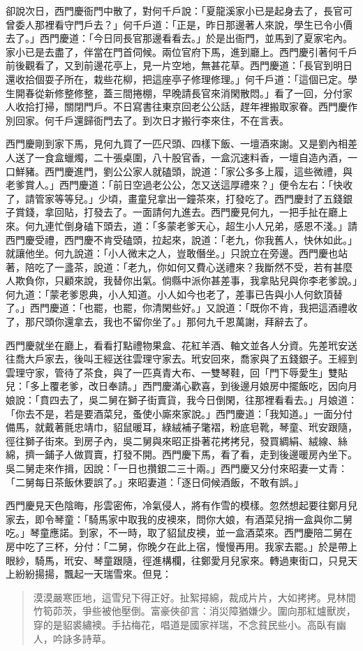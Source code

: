 卻說次日，西門慶衙門中散了，對何千戶說：「夏龍溪家小已是起身去了，長官可曾委人那裡看守門戶去？」何千戶道：「正是，昨日那邊著人來說，學生已令小價去了。」西門慶道：「今日同長官那邊看看去。」於是出衙門，並馬到了夏家宅內。家小已是去盡了，伴當在門首伺候。兩位官府下馬，進到廳上。西門慶引著何千戶前後觀看了，又到前邊花亭上，見一片空地，無甚花草。西門慶道：「長官到明日還收拾個耍子所在，栽些花柳，把這座亭子修理修理。」何千戶道：「這個已定。學生開春從新修整修整，蓋三間捲棚，早晚請長官來消閑散悶。」看了一回，分付家人收拾打掃，關閉門戶。不日寫書往東京回老公公話，趕年裡搬取家眷。西門慶作別回家。何千戶還歸衙門去了。到次日才搬行李來住，不在言表。

西門慶剛到家下馬，見何九買了一匹尺頭、四樣下飯、一壇酒來謝。又是劉內相差人送了一食盒蠟燭，二十張桌圍，八十股官香，一盒沉速料香，一壇自造內酒，一口鮮豬。西門慶進門，劉公公家人就磕頭，說道：「家公多多上履，這些微禮，與老爹賞人。」西門慶道：「前日空過老公公，怎又送這厚禮來？」便令左右：「快收了，請管家等等兒。」少頃，畫童兒拿出一鐘茶來，打發吃了。西門慶封了五錢銀子賞錢，拿回貼，打發去了。一面請何九進去。西門慶見何九，一把手扯在廳上來。何九連忙倒身磕下頭去，道：「多蒙老爹天心，超生小人兄弟，感恩不淺。」請西門慶受禮，西門慶不肯受磕頭，拉起來，說道：「老九，你我舊人，快休如此。」就讓他坐。何九說道：「小人微末之人，豈敢僭坐。」只說立在旁邊。西門慶也站著，陪吃了一盞茶，說道：「老九，你如何又費心送禮來？我斷然不受，若有甚麼人欺負你，只顧來說，我替你出氣。倘縣中派你甚差事，我拿貼兒與你李老爹說。」何九道：「蒙老爹恩典，小人知道。小人如今也老了，差事已告與小人何欽頂替了。」西門慶道：「也罷，也罷，你清閑些好。」又說道：「既你不肯，我把這酒禮收了，那尺頭你還拿去，我也不留你坐了。」那何九千恩萬謝，拜辭去了。

西門慶就坐在廳上，看看打點禮物果盒、花紅羊酒、軸文並各人分資。先差玳安送往喬大戶家去，後叫王經送往雲理守家去。玳安回來，喬家與了五錢銀子。王經到雲理守家，管待了茶食，與了一匹真青大布、一雙琴鞋，回「門下辱愛生」雙貼兒：「多上覆老爹，改日奉請。」西門慶滿心歡喜，到後邊月娘房中擺飯吃，因向月娘說：「賁四去了，吳二舅在獅子街賣貨，我今日倒閑，往那裡看看去。」月娘道：「你去不是，若是要酒菜兒，蚤使小廝來家說。」西門慶道：「我知道。」一面分付備馬，就戴著氈忠靖巾，貂鼠暖耳，綠絨補子氅褶，粉底皂靴，琴童、玳安跟隨，徑往獅子街來。到房子內，吳二舅與來昭正掛著花拷拷兒，發買綢絹、絨線、絲綿，擠一鋪子人做買賣，打發不開。西門慶下馬，看了看，走到後邊暖房內坐下。吳二舅走來作揖，因說：「一日也攢銀二三十兩。」西門慶又分付來昭妻一丈青：「二舅每日茶飯休要誤了。」來昭妻道：「逐日伺候酒飯，不敢有誤。」

西門慶見天色陰晦，彤雲密佈，冷氣侵人，將有作雪的模樣。忽然想起要往鄭月兒家去，即令琴童：「騎馬家中取我的皮襖來，問你大娘，有酒菜兒捎一盒與你二舅吃。」琴童應諾。到家，不一時，取了貂鼠皮襖，並一盒酒菜來。西門慶陪二舅在房中吃了三杯，分付：「二舅，你晚夕在此上宿，慢慢再用。我家去罷。」於是帶上眼紗，騎馬，玳安、琴童跟隨，徑進構欄，往鄭愛月兒家來。轉過東街口，只見天上紛紛揚揚，飄起一天瑞雪來。但見：
\begin{quote}
漠漠嚴寒匝地，這雪兒下得正好。扯絮撏綿，裁成片片，大如拷拷。見林間竹筍茆茨，爭些被他壓倒。富豪俠卻言：消災障猶嫌少。圍向那紅爐獸炭，穿的是貂裘繡襖。手拈梅花，唱道是國家祥瑞，不念貧民些小。高臥有幽人，吟詠多詩草。
\end{quote}

